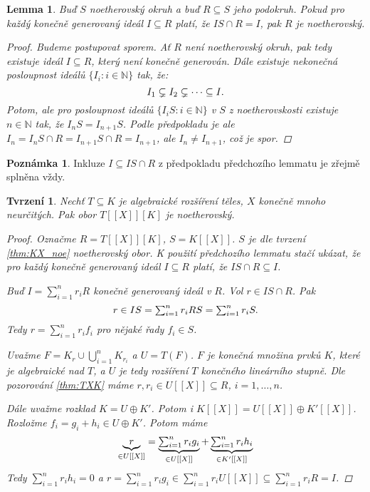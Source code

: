 \documentclass[11pt,a4paper]{article}
\newcommand\m[1]{\mathbb { #1 }} %
\newcommand\N{\m N}
\newcommand*{\ml}[1]{\[\textstyle\let\displaystyle\textstyle#1\]}	%
\newcounter{numb}
\theoremstyle{definition}
\newtheorem{poznamka}[numb]{Poznámka}		%
\theoremstyle{plain}
\newtheorem{lemma}[numb]{Lemma}
\newtheorem{tvrzeni}[numb]{Tvrzení}
\begin{document}
\begin{lemma}
	Buď $S$ noetherovský okruh a buď $R \subseteq S$ jeho podokruh. Pokud pro každý konečně generovaný ideál $I \subseteq R$ platí, že $IS \cap R = I$, pak $R$ je noetherovský.

	\begin{proof}
		Budeme postupovat sporem. Ať $R$ není noetherovský okruh, pak tedy existuje ideál $I \subseteq R$, který není konečně generován. Dále existuje nekonečná posloupnost ideálů $\{I_i: i \in \N\}$ tak, že:
		\ml{
			I_1 \subsetneq I_2 \subsetneq \dots \subseteq I.
		}
		Potom, ale pro posloupnost ideálů $\{I_i S: i \in \N\}$ v $S$ z noetherovskosti existuje $n \in \N$ tak, že $I_n S = I_{n + 1} S$. Podle předpokladu je ale $I_n = I_n S \cap R = I_{n + 1} S \cap R = I_{n + 1}$, ale $I_n \not= I_{n+1}$, což je spor.
	\end{proof}
\end{lemma}

\begin{poznamka}
	Inkluze $I \subseteq IS \cap R$ z předpokladu předchozího lemmatu je zřejmě splněna vždy.
\end{poznamka}

\begin{tvrzeni}
	Nechť $T \subseteq K$ je algebraické rozšíření těles, $X$ konečně mnoho neurčitých. Pak obor $T[[X]][K]$ je noetherovský.

	\begin{proof}
		\newcommand*\I{_{i = 1}^n}

		Označme $R = T[[X]][K]$, $S = K[[X]]$. $S$ je dle tvrzení \ref{thm:KX_noe} noetherovský obor. K použití předchozího lemmatu stačí ukázat, že pro každý konečně generovaný ideál $I \subseteq R$ platí, že $IS \cap R \subseteq I$.

		Buď $I = \sum\I r_i R$ konečně generovaný ideál v $R$. Vol $r \in IS \cap R$. Pak
		\ml{
			r \in IS = \sum\I r_i RS = \sum\I r_i S.
		}
		Tedy $r = \sum\I r_i f_i$ pro nějaké řady $f_i \in S$.

		Uvažme $F = K_r \cup \bigcup\I K_{r_i}$ a $U = T(F)$. $F$ je konečná množina prvků $K$, které je algebraické nad $T$, a $U$ je tedy rozšíření $T$ konečného lineárního stupně. Dle pozorování \ref{thm:TXK} máme $r, r_i \in U[[X]] \subseteq R$, $i = 1, \hdots, n$.

		Dále uvažme rozklad $K = U \oplus K'$. Potom i $K[[X]] = U[[X]] \oplus K'[[X]]$. Rozložme $f_i = g_i + h_i \in U \oplus K'$. Potom máme
		\ml{
			\underbrace{r}_{\in U[[X]]} = \underbrace{\sum\I r_i g_i}_{\in U[[X]]} + \underbrace{\sum\I r_i h_i}_{\in K'[[X]]}
		}
		Tedy $\sum\I r_i h_i = 0$ a $r = \sum\I r_i g_i \in \sum\I r_i U[[X]] \subseteq \sum\I r_i R = I$.
	\end{proof}
\end{tvrzeni}
\end{document}
